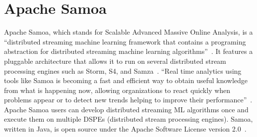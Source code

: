 \section{Apache Samoa}
Apache Samoa, which stands for Scalable Advanced Massive Online Analysis, is a ``distributed 
streaming machine learning framework that contains a programing abstraction for distributed 
streaming machine learning algorithms''~\cite{hid-sp18-405-www-samoa}. It features a pluggable 
architecture that allows it to run on several distributed stream processing engines such as Storm, S4, 
and Samza~\cite{hid-sp18-405-www-samoa}. ``Real time analytics using tools like Samoa is becoming 
a fast and efficient way to obtain useful knowledge from what is happening now, allowing 
organizations to react quickly when problems appear or to detect new trends helping to improve their 
performance''~\cite{hid-sp18-405-bif2015mining-samoa}. Apache Samoa users can develop distributed 
streaming ML algorithms once and execute them on multiple DSPEs (distributed stream processing 
engines). Samoa, written in Java, is open source under the Apache Software License version 
2.0~\cite{hid-sp18-405-mor2015samoa-samoa}.
